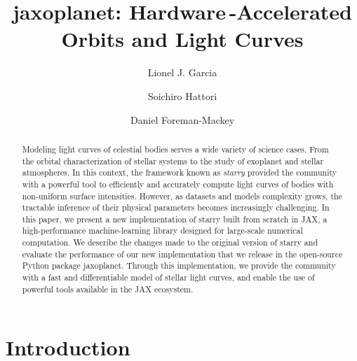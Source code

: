 \documentclass[modern]{aastex631}
\begin{document}
\title{\textsf{jaxoplanet}: Hardware\,-Accelerated Orbits and Light Curves}

\author[0000-0002-4296-2246]{Lionel J. Garcia}
\author[0000-0002-0842-863X]{Soichiro Hattori}
\author[0000-0002-9328-5652]{Daniel Foreman-Mackey}

\keywords{}

\begin{abstract}
    Modeling light curves of celestial bodies serves a wide variety of science cases. From the orbital characterization of stellar systems to the study of exoplanet and stellar atmospheres. In this context, the framework known as \textit{starry} provided the community with a powerful tool to efficiently and accurately compute light curves of bodies with non-uniform surface intensities. However, as datasets and models complexity grows, the tractable inference of their physical parameters becomes increasingly challenging. In this paper, we present a new implementation of \textsf{starry} built from scratch in \textsf{JAX}, a high-performance machine-learning library designed for large-scale numerical computation. We describe the changes made to the original version of \textsf{starry} and evaluate the performance of our new implementation that we release in the open-source Python package \textsf{jaxoplanet}. Through this implementation, we provide the community with a fast and differentiable model of stellar light curves, and enable the use of powerful tools available in the \textsf{JAX} ecosystem. \gitlink{}
\end{abstract}

\section{Introduction}
\end{document}
